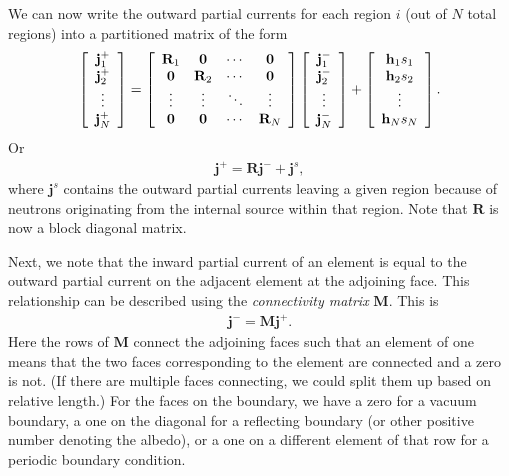 We can now write the outward partial currents for each region $i$ (out of $N$ total regions) into a partitioned matrix of the form
\begin{align}
  \left[ \begin{array}{c} \mathbf{j}^+_1 \\ \mathbf{j}^+_2 \\ \vdots \\ \mathbf{j}^+_N \\ \end{array} \right]
  = \left[ \begin{array}{c c c c}
  \mathbf{R}_1 	& \mathbf{0} 	& \cdots & \mathbf{0}	\\
  \mathbf{0}	& \mathbf{R}_2  & \cdots & \mathbf{0}	\\
  \vdots		& \vdots		& \ddots & \vdots		\\
  \mathbf{0}	& \mathbf{0}	& \cdots & \mathbf{R}_N \\ \end{array} \right]
  \left[ \begin{array}{c} \mathbf{j}^-_1 \\ \mathbf{j}^-_2 \\ \vdots \\ \mathbf{j}^-_N \\ \end{array} \right]
  + \left[ \begin{array}{c} \mathbf{h}_1 s_1 \\ \mathbf{h}_2 s_2 \\ \vdots \\ \mathbf{h}_N s_N \\ \end{array} \right] .
\end{align}
Or
\begin{align} \label{Eq:transport_transmissionProbabilityMethod_relateCurrents}
  \mathbf{j}^+ = \mathbf{R} \mathbf{j}^- + \mathbf{j}^s ,
\end{align}
where $\mathbf{j}^s$ contains the outward partial currents leaving a given region because of neutrons originating from the internal source within that region. Note that $\mathbf{R}$ is now a block diagonal matrix.

Next, we note that the inward partial current of an element is equal to the outward partial current on the adjacent element at the adjoining face. This relationship can be described using the \emph{connectivity matrix} $\mathbf{M}$. This is
\begin{align}
  \mathbf{j}^- = \mathbf{M} \mathbf{j}^+ .
\end{align}
Here the rows of $\mathbf{M}$ connect the adjoining faces such that an element of one means that the two faces corresponding to the element are connected and a zero is not. (If there are multiple faces connecting, we could split them up based on relative length.) For the faces on the boundary, we have a zero for a vacuum boundary, a one on the diagonal for a reflecting boundary (or other positive number denoting the albedo), or a one on a different element of that row for a periodic boundary condition.

